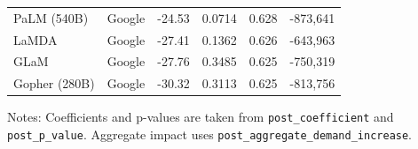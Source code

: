 \documentclass[sigconf]{acmart}
\begin{document}
\begin{table}[htbp]
{\begin{threeparttable}
\begin{tabular}{l l r r r r}
PaLM (540B)                    & Google     & -24.53 & 0.0714                & 0.628 &  -873,641 \\
LaMDA                          & Google     & -27.41 & 0.1362                & 0.626 &  -643,963 \\
GLaM                           & Google     & -27.76 & 0.3485                & 0.625 &  -750,319 \\
Gopher (280B)                  & Google     & -30.32 & 0.3113                & 0.625 &  -813,756 \\
\bottomrule
\end{tabular}
\begin{tablenotes}
\item Notes: Coefficients and p-values are taken from \texttt{post\_coefficient} and \texttt{post\_p\_value}. Aggregate impact uses \texttt{post\_aggregate\_demand\_increase}.
\end{tablenotes}
\end{threeparttable}}
\label{PostTreatment}
\end{table}
\end{document}

